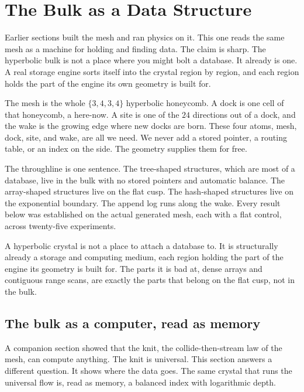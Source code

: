 \section{The Bulk as a Data Structure}

Earlier sections built the mesh and ran physics on it. This one reads the same mesh as a machine for holding and finding data. The claim is sharp. The hyperbolic bulk is not a place where you might bolt a database. It already is one. A real storage engine sorts itself into the crystal region by region, and each region holds the part of the engine its own geometry is built for.

The mesh is the whole $\{3,4,3,4\}$ hyperbolic honeycomb. A dock is one cell of that honeycomb, a here-now. A site is one of the $24$ directions out of a dock, and the wake is the growing edge where new docks are born. These four atoms, mesh, dock, site, and wake, are all we need. We never add a stored pointer, a routing table, or an index on the side. The geometry supplies them for free.

The throughline is one sentence. The tree-shaped structures, which are most of a database, live in the bulk with no stored pointers and automatic balance. The array-shaped structures live on the flat cusp. The hash-shaped structures live on the exponential boundary. The append log runs along the wake. Every result below was established on the actual generated mesh, each with a flat control, across twenty-five experiments.

\begin{result}
A hyperbolic crystal is not a place to attach a database to. It is structurally already a storage and computing medium, each region holding the part of the engine its geometry is built for. The parts it is bad at, dense arrays and contiguous range scans, are exactly the parts that belong on the flat cusp, not in the bulk.
\end{result}

\subsection{The bulk as a computer, read as memory}

A companion section showed that the knit, the collide-then-stream law of the mesh, can compute anything. The knit is universal. This section answers a different question. It shows where the data goes. The same crystal that runs the universal flow is, read as memory, a balanced index with logarithmic depth.

